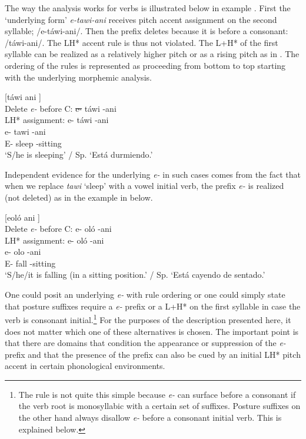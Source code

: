 \documentclass[output=paper,hidelinks]{langscibook}
\begin{document}
The way the analysis works for verbs is illustrated below in example . First the `underlying form' \textit{e-tawi-ani} receives pitch accent assignment on the second syllable; /e-táwi-ani/. Then the prefix deletes because it is before a consonant: /táwi-ani/. The LH* accent rule is thus not violated. The L+H* of the first syllable can be realized as a relatively higher pitch or as a rising pitch as in . The ordering of the rules is represented as proceeding from bottom to top starting with the underlying morphemic analysis.


\ea \label{ex:tawiani}
	  [táwi ani \downarrow] \\
        Delete \textit{e-} before C: \sout{e-} táwi -ani \\    
	      LH* assignment: e- táwi -ani \\
       \gll e- tawi -ani \\
	    E- sleep -sitting \\
    \glt `S/he is sleeping' / Sp. `Está durmiendo.' 
\z


Independent evidence for the underlying \textit{e-} in such cases comes from the fact that when we replace \textit{tawi} `sleep' with a vowel initial verb, the prefix \textit{e-} is realized (not deleted) as in the example in  below.

\ea \label{ex:eoloani}
	  [eoló ani \downarrow] \\
        Delete \textit{e-} before C: e- oló -ani \\    
	   LH* assignment: e- oló -ani \\
	   \gll e- olo -ani \\
	   E- fall -sitting \\
	   \glt `S/he/it is falling (in a sitting position.' / Sp. `Está cayendo de sentado.'
\z

One could posit an underlying \textit{e-} with rule ordering or one could simply state that posture suffixes require a \textit{e-} prefix or a L+H* on the first syllable in case the verb is consonant initial.\footnote{The rule is not quite this simple because \textit{e-} can surface before a consonant if the verb root is monosyllabic with a certain set of suffixes. Posture suffixes on the other hand always disallow \textit{e-} before a consonant initial verb. This is explained below.} For the purposes of the description presented here, it does not matter which one of these alternatives is chosen. The important point is that there are domains that condition the appearance or suppression of the \textit{e-} prefix and that the presence of the prefix can also be cued by an initial LH* pitch accent in certain phonological environments. 
\end{document}
